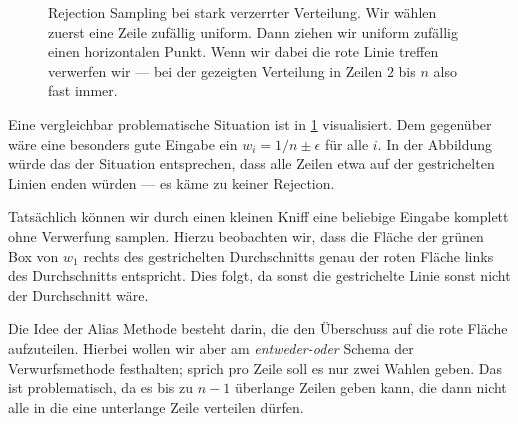 \begin{figure}
    \begin{center}
        \def\w{5cm}
        \def\h{5mm}
    \end{center}
    \caption{
        Rejection Sampling bei stark verzerrter Verteilung.
        Wir wählen zuerst eine Zeile zufällig uniform.
        Dann ziehen wir uniform zufällig einen horizontalen Punkt.
        Wenn wir dabei die rote Linie treffen verwerfen wir --- bei der gezeigten Verteilung in Zeilen $2$ bis $n$ also fast immer.
    }
    \label{fig:alias-tab-motivation}
\end{figure}

Eine vergleichbar problematische Situation ist in \cref{fig:alias-tab-motivation} visualisiert.
Dem gegenüber wäre eine besonders gute Eingabe ein $w_i = 1/n \pm \epsilon$ für alle $i$.
In der Abbildung würde das der Situation entsprechen, dass alle Zeilen etwa auf der gestrichelten Linien enden würden --- es käme zu keiner Rejection.

Tatsächlich können wir durch einen kleinen Kniff eine beliebige Eingabe komplett ohne Verwerfung samplen.
Hierzu beobachten wir, dass die Fläche der grünen Box von $w_1$ rechts des gestrichelten Durchschnitts genau der roten Fläche links des Durchschnitts entspricht.
Dies folgt, da sonst die gestrichelte Linie sonst nicht der Durchschnitt wäre.

Die Idee der Alias Methode besteht darin, die den Überschuss auf die rote Fläche aufzuteilen.
Hierbei wollen wir aber am \emph{entweder-oder} Schema der Verwurfsmethode festhalten;
sprich pro Zeile soll es nur zwei Wahlen geben.
Das ist problematisch, da es bis zu $n-1$ überlange Zeilen geben kann, die dann nicht alle in die eine unterlange Zeile verteilen dürfen.

